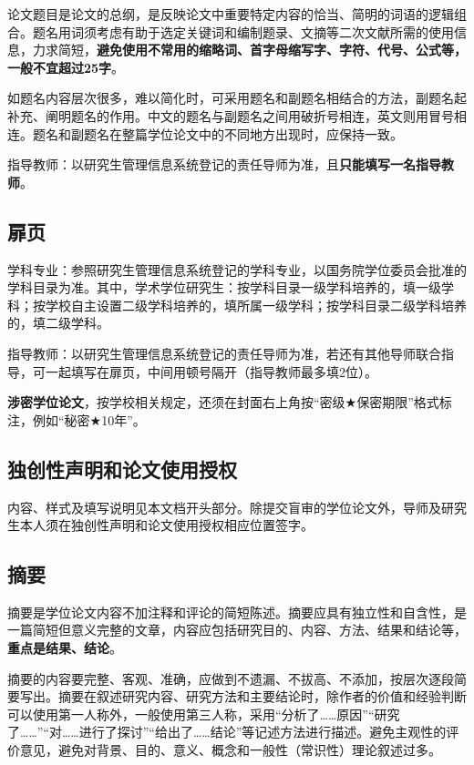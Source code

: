 论文题目是论文的总纲，是反映论文中重要特定内容的恰当、简明的词语的逻辑组合。题名用词须考虑有助于选定关键词和编制题录、文摘等二次文献所需的使用信息，力求简短，\textbf{避免使用不常用的缩略词、首字母缩写字、字符、代号、公式等，一般不宜超过25字}。

如题名内容层次很多，难以简化时，可采用题名和副题名相结合的方法，副题名起补充、阐明题名的作用。中文的题名与副题名之间用破折号相连，英文则用冒号相连。题名和副题名在整篇学位论文中的不同地方出现时，应保持一致。

指导教师：以研究生管理信息系统登记的责任导师为准，且\textbf{只能填写一名指导教师}。

\subsection{扉页}

学科专业：参照研究生管理信息系统登记的学科专业，以国务院学位委员会批准的学科目录为准。其中，学术学位研究生：按学科目录一级学科培养的，填一级学科；按学校自主设置二级学科培养的，填所属一级学科；按学科目录二级学科培养的，填二级学科。

指导教师：以研究生管理信息系统登记的责任导师为准，若还有其他导师联合指导，可一起填写在扉页，中间用顿号隔开（指导教师最多填2位）。

\textbf{涉密学位论文}，按学校相关规定，还须在封面右上角按“密级$\bigstar$保密期限”格式标注，例如“秘密$\bigstar$10年”。

\subsection{独创性声明和论文使用授权}

内容、样式及填写说明见本文档开头部分。除提交盲审的学位论文外，导师及研究生本人须在独创性声明和论文使用授权相应位置签字。

\subsection{摘要}

摘要是学位论文内容不加注释和评论的简短陈述。摘要应具有独立性和自含性，是一篇简短但意义完整的文章，内容应包括研究目的、内容、方法、结果和结论等，\textbf{重点是结果、结论}。

摘要的内容要完整、客观、准确，应做到不遗漏、不拔高、不添加，按层次逐段简要写出。摘要在叙述研究内容、研究方法和主要结论时，除作者的价值和经验判断可以使用第一人称外，一般使用第三人称，采用“分析了……原因”“研究了……”“对……进行了探讨”“给出了……结论”等记述方法进行描述。避免主观性的评价意见，避免对背景、目的、意义、概念和一般性（常识性）理论叙述过多。

